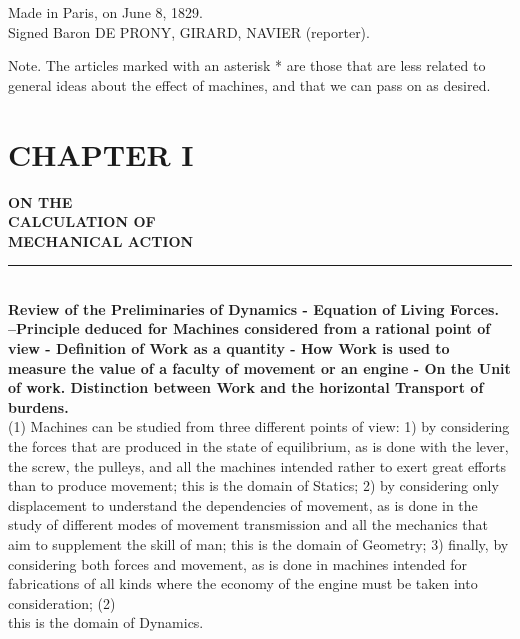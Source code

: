 \documentclass{book}
\begin{document}
\begin{flushright}

 Made in Paris, on June 8, 1829. 
\\
Signed Baron DE PRONY, GIRARD, NAVIER (reporter).
\end{flushright}







\tableofcontents
\vfill
Note. The articles marked with an asterisk * are those that are less related to general ideas about the effect of machines, and that we can pass on as desired.




\mainmatter


\chapter{CHAPTER I}
\textbf{\fontsize{26}{26}\selectfont ON THE\\ CALCULATION OF \\MECHANICAL ACTION}

\par\noindent\rule{\textwidth}{2pt}\\
\textbf{Review of the Preliminaries of Dynamics - Equation of Living Forces. –Principle deduced for Machines considered from a rational point of view - Definition of Work as a quantity - How Work is used to measure the value of a faculty of movement or an engine - On the Unit of work. Distinction between Work and the horizontal Transport of burdens.}
\vspace{26pt}
\\
(1) Machines can be studied from three different points of view: 1) by considering the forces that are produced in the state of equilibrium, as is done with the lever, the screw, the pulleys, and all the machines intended rather to exert great efforts than to produce movement; this is the domain of Statics; 2) by considering only displacement to understand the dependencies of movement, as is done in the study of different modes of movement transmission and all the mechanics that aim to supplement the skill of man; this 
is the domain of Geometry; 3) finally, by considering both forces and movement, as is done in machines intended for fabrications of all kinds where the economy of the engine must be taken into consideration;
\newpage
(2) \\
this is the domain of Dynamics.
\end{document}
